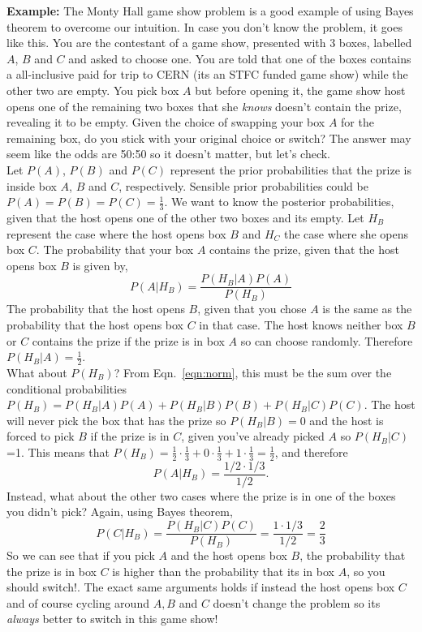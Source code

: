 \begin{tcolorbox}[colback = backblue]
\textbf{Example:} The Monty Hall game show problem is a good example of using Bayes theorem to overcome our intuition. In case you don't know the problem, it goes like this. You are the contestant of a game show, presented with 3 boxes, labelled $A$, $B$ and $C$ and asked to choose one. You are told that one of the boxes contains a all-inclusive paid for trip to CERN (its an STFC funded game show) while the other two are empty. You pick box $A$ but before opening it, the game show host opens one of the remaining two boxes that she \emph{knows} doesn't contain the prize, revealing it to be empty. Given the choice of swapping your box $A$ for the remaining box, do you stick with your original choice or switch? The answer may seem like the odds are 50:50 so it doesn't matter, but let's check. 
\\
Let $P(A)$, $P(B)$ and $P(C)$ represent the  prior probabilities that the prize is inside box $A$, $B$ and $C$, respectively. Sensible prior probabilities could be $P(A)=P(B)=P(C)=\frac{1}{3}$. We want to know the posterior probabilities, given that the host opens one of the other two boxes and its empty. 
Let $H_B$ represent the case where the host opens box $B$ and $H_{C}$ the case where she opens box $C$. The probability that your box $A$ contains the prize, given that the host opens box $B$ is given by, 
\begin{equation}
    P(A|H_{B}) = \frac{P(H_{B}|A)P(A)}{P(H_{B})}
\end{equation}
The probability that the host opens $B$, given that you chose $A$ is the same as the probability that the host opens box $C$ in that case. The host knows neither box $B$ or $C$ contains the prize if the prize is in box $A$ so can choose randomly. Therefore $P(H_{B}|A)=\frac{1}{2}$. 
\\
What about $P(H_B)$? From Eqn.~\ref{eqn:norm}, this must be the sum over the conditional probabilities $P(H_{B})=P(H_B|A)P(A)+P(H_B|B)P(B)+P(H_B|C)P(C)$. The host will never pick the box that has the prize so $P(H_B|B)=0$ and the host is forced to pick $B$ if the prize is in $C$, given you've already picked $A$ so $P(H_B|C)$=1.  
This means that $P(H_B)=\frac{1}{2}\cdot\frac{1}{3}+0\cdot\frac{1}{3}+1\cdot\frac{1}{3}=\frac{1}{2}$, and therefore
\begin{equation}
    P(A|H_{B})=\frac{1/2 \cdot 1/3}{1/2}.
\end{equation}
Instead, what about the other two cases where the prize is in one of the boxes you didn't pick? Again, using Bayes theorem,
\begin{equation}
    P(C|H_B)= \frac{P(H_B|C)P(C)}{P(H_B)} = \frac{1\cdot1/3}{1/2} = \frac{2}{3}
\end{equation}
So we can see that if you pick $A$ and the host opens box $B$, the probability that the prize is in box $C$ is higher than the probability that its in box $A$, so you should switch!.  
The exact same arguments holds if instead the host opens box $C$ and of course cycling around $A, B$ and $C$ doesn't change the problem so its \emph{always} better to switch in this game show!
\end{tcolorbox}

